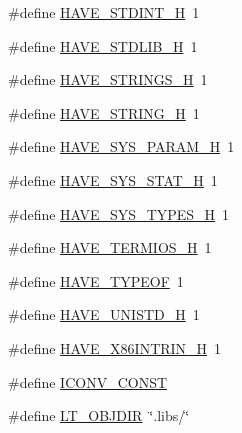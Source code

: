 \begin{DoxyCompactItemize}
\item 
\#define \hyperlink{mac_2config_2i386_2lib-src_2libflac_2config_8h_ab6cd6d1c63c1e26ea2d4537b77148354}{H\+A\+V\+E\+\_\+\+S\+T\+D\+I\+N\+T\+\_\+H}~1
\item 
\#define \hyperlink{mac_2config_2i386_2lib-src_2libflac_2config_8h_a9e0e434ec1a6ddbd97db12b5a32905e0}{H\+A\+V\+E\+\_\+\+S\+T\+D\+L\+I\+B\+\_\+H}~1
\item 
\#define \hyperlink{mac_2config_2i386_2lib-src_2libflac_2config_8h_a405d10d46190bcb0320524c54eafc850}{H\+A\+V\+E\+\_\+\+S\+T\+R\+I\+N\+G\+S\+\_\+H}~1
\item 
\#define \hyperlink{mac_2config_2i386_2lib-src_2libflac_2config_8h_ad4c234dd1625255dc626a15886306e7d}{H\+A\+V\+E\+\_\+\+S\+T\+R\+I\+N\+G\+\_\+H}~1
\item 
\#define \hyperlink{mac_2config_2i386_2lib-src_2libflac_2config_8h_a05aa9fc25e1231d8eb347390558e4e22}{H\+A\+V\+E\+\_\+\+S\+Y\+S\+\_\+\+P\+A\+R\+A\+M\+\_\+H}~1
\item 
\#define \hyperlink{mac_2config_2i386_2lib-src_2libflac_2config_8h_ace156430ba007d19b4348a950d0c692b}{H\+A\+V\+E\+\_\+\+S\+Y\+S\+\_\+\+S\+T\+A\+T\+\_\+H}~1
\item 
\#define \hyperlink{mac_2config_2i386_2lib-src_2libflac_2config_8h_a69dc70bea5d1f8bd2be9740e974fa666}{H\+A\+V\+E\+\_\+\+S\+Y\+S\+\_\+\+T\+Y\+P\+E\+S\+\_\+H}~1
\item 
\#define \hyperlink{mac_2config_2i386_2lib-src_2libflac_2config_8h_a55e62c01f41f9c5850dfce5f89a6bb98}{H\+A\+V\+E\+\_\+\+T\+E\+R\+M\+I\+O\+S\+\_\+H}~1
\item 
\#define \hyperlink{mac_2config_2i386_2lib-src_2libflac_2config_8h_a83bb01f514f403b03f1d32474eb6eba7}{H\+A\+V\+E\+\_\+\+T\+Y\+P\+E\+OF}~1
\item 
\#define \hyperlink{mac_2config_2i386_2lib-src_2libflac_2config_8h_a219b06937831d0da94d801ab13987639}{H\+A\+V\+E\+\_\+\+U\+N\+I\+S\+T\+D\+\_\+H}~1
\item 
\#define \hyperlink{mac_2config_2i386_2lib-src_2libflac_2config_8h_a8fc620cde24f1aa63375410af8d86bf7}{H\+A\+V\+E\+\_\+\+X86\+I\+N\+T\+R\+I\+N\+\_\+H}~1
\item 
\#define \hyperlink{mac_2config_2i386_2lib-src_2libflac_2config_8h_a6a74c8cf135bdbe2216980041d0d74fa}{I\+C\+O\+N\+V\+\_\+\+C\+O\+N\+ST}
\item 
\#define \hyperlink{mac_2config_2i386_2lib-src_2libflac_2config_8h_ac2d5925d76379847dd9fc4747b061659}{L\+T\+\_\+\+O\+B\+J\+D\+IR}~\char`\"{}.libs/\char`\"{}
\item 

\end{DoxyCompactItemize}
